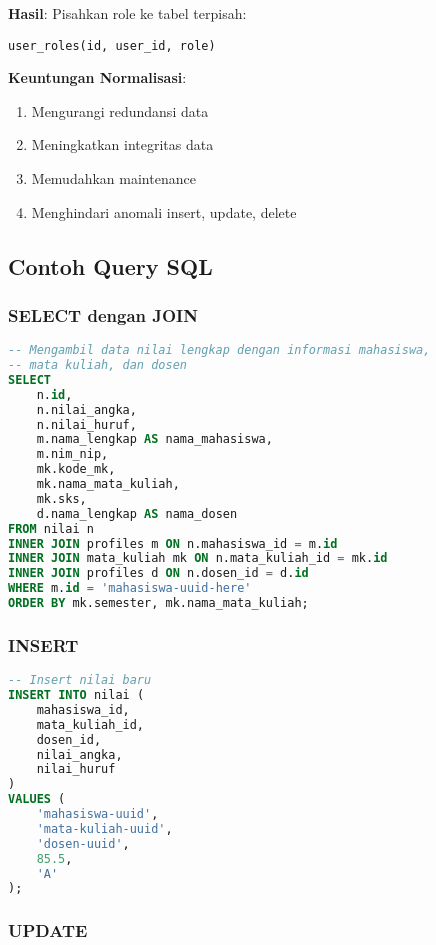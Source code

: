 \documentclass[12pt,a4paper]{article}
\begin{document}
\textbf{Hasil}: Pisahkan role ke tabel terpisah:
\begin{verbatim}
user_roles(id, user_id, role)
\end{verbatim}

\textbf{Keuntungan Normalisasi}:
\begin{enumerate}
    \item Mengurangi redundansi data
    \item Meningkatkan integritas data
    \item Memudahkan maintenance
    \item Menghindari anomali insert, update, delete
\end{enumerate}

\subsection{Contoh Query SQL}

\subsubsection{SELECT dengan JOIN}

\begin{lstlisting}[language=SQL]
-- Mengambil data nilai lengkap dengan informasi mahasiswa,
-- mata kuliah, dan dosen
SELECT 
    n.id,
    n.nilai_angka,
    n.nilai_huruf,
    m.nama_lengkap AS nama_mahasiswa,
    m.nim_nip,
    mk.kode_mk,
    mk.nama_mata_kuliah,
    mk.sks,
    d.nama_lengkap AS nama_dosen
FROM nilai n
INNER JOIN profiles m ON n.mahasiswa_id = m.id
INNER JOIN mata_kuliah mk ON n.mata_kuliah_id = mk.id
INNER JOIN profiles d ON n.dosen_id = d.id
WHERE m.id = 'mahasiswa-uuid-here'
ORDER BY mk.semester, mk.nama_mata_kuliah;
\end{lstlisting}

\subsubsection{INSERT}

\begin{lstlisting}[language=SQL]
-- Insert nilai baru
INSERT INTO nilai (
    mahasiswa_id, 
    mata_kuliah_id, 
    dosen_id, 
    nilai_angka, 
    nilai_huruf
)
VALUES (
    'mahasiswa-uuid',
    'mata-kuliah-uuid',
    'dosen-uuid',
    85.5,
    'A'
);
\end{lstlisting}

\subsubsection{UPDATE}
\end{document}
